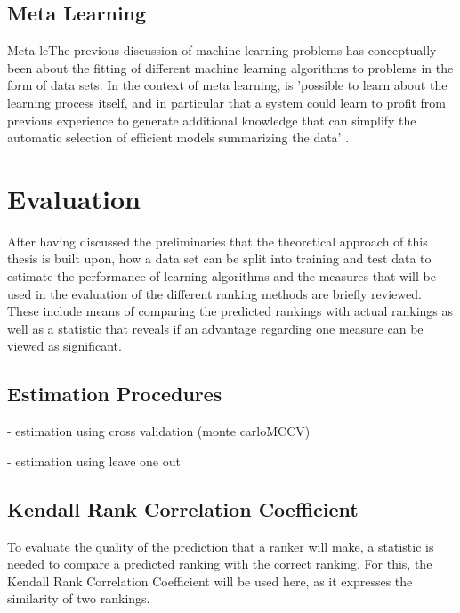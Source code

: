 \subsection{Meta Learning}
Meta leThe previous discussion of machine learning problems has conceptually been about the fitting of different machine learning algorithms to problems in the form of data sets. In the context of meta learning, is 'possible to learn about the learning process
itself, and in particular that a system could learn to profit from previous
experience to generate additional knowledge that can simplify the automatic
selection of efficient models summarizing the data' \cite{razdil2008metalearning}.


\section{Evaluation}

After having discussed the preliminaries that the theoretical approach of this thesis is built upon, how a data set can be split into training and test data to estimate the performance of learning algorithms and the measures that will be used in the evaluation of the different ranking methods are briefly reviewed. These include means of comparing the predicted rankings with actual rankings as well as a statistic that reveals if an advantage regarding one measure can be viewed as significant.

\subsection{Estimation Procedures}

- estimation using cross validation (monte carloMCCV)

- estimation using leave one out

\subsection{Kendall Rank Correlation Coefficient}
To evaluate the quality of the prediction that a ranker will make, a statistic is needed to compare a predicted ranking with the correct ranking. For this, the Kendall Rank Correlation Coefficient will be used here, as it expresses the similarity of two rankings.

